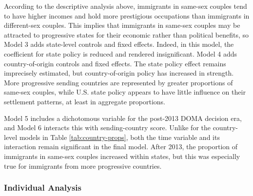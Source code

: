 \documentclass[
  11pt,
]{article}
\begin{document}
According to the descriptive analysis above, immigrants in same-sex couples tend to have higher incomes and hold more prestigious occupations than immigrants in different-sex couples. This implies that immigrants in same-sex couples may be attracted to progressive states for their economic rather than political benefits, so Model 3 adds state-level controls and fixed effects. Indeed, in this model, the coefficient for state policy is reduced and rendered insignificant. Model 4 adds country-of-origin controls and fixed effects. The state policy effect remains imprecisely estimated, but country-of-origin policy has increased in strength. More progressive sending countries are represented by greater proportions of same-sex couples, while U.S. state policy appears to have little influence on their settlement patterns, at least in aggregate proportions.

Model 5 includes a dichotomous variable for the post-2013 DOMA decision era, and Model 6 interacts this with sending-country score. Unlike for the country-level models in Table \ref{tab:country-props}, both the time variable and its interaction remain significant in the final model. After 2013, the proportion of immigrants in same-sex couples increased within states, but this was especially true for immigrants from more progressive countries.

\hypertarget{individual-analysis}{%
\subsubsection{Individual Analysis}\label{individual-analysis}}
\end{document}
